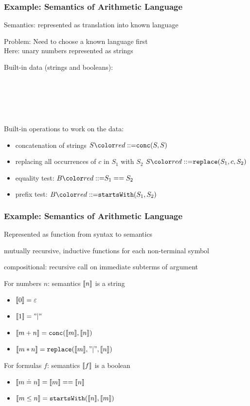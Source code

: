 \documentclass{beamer}
\begin{document}
\begin{frame}\frametitle{Example: Semantics of Arithmetic Language}
Semantics: represented as translation into known language
\medskip

Problem: Need to choose a known language first\\
Here: unary numbers represented as strings

Built-in data (strings and booleans):
\begin{commgrammar}
\\
\\
\\
\\
\end{commgrammar}

Built-in operations to work on the data:
\begin{itemize}
\item concatenation of strings $S\bbc \cn{conc}(S,S)$
\item replacing all occurrences of $c$ in $S_1$ with $S_2$ $S\bbc \cn{replace}(S_1,c,S_2)$
\item equality test: $B\bbc S_1==S_2$
\item prefix test: $B\bbc \cn{startsWith}(S_1,S_2)$
\end{itemize}
\end{frame}

\begin{frame}\frametitle{Example: Semantics of Arithmetic Language}
\begin{blockitems}{Represented as function from syntax to semantics}
\item mutually recursive, inductive functions for each non-terminal symbol
\item compositional: recursive call on immediate subterms of argument
\end{blockitems}

For numbers $n$: semantics $\llbracket n\rrbracket$ is a string
\begin{itemize}
\item $\llbracket 0\rrbracket=\varepsilon$
\item $\llbracket 1\rrbracket="|"$
\item $\llbracket m+n\rrbracket=\mathtt{conc}(\llbracket m\rrbracket,\llbracket n\rrbracket)$
\item $\llbracket m*n\rrbracket=\mathtt{replace}(\llbracket m\rrbracket,"|",\llbracket n\rrbracket)$
\end{itemize}
\medskip

For formulas $f$: semantics $\llbracket f\rrbracket$ is a boolean
\begin{itemize}
\item $\llbracket m\doteq n\rrbracket=\llbracket m\rrbracket==\llbracket n\rrbracket$
\item $\llbracket m\leq n\rrbracket=\mathtt{startsWith}(\llbracket n\rrbracket,\llbracket m\rrbracket)$
\end{itemize}
\end{frame}
\end{document}
